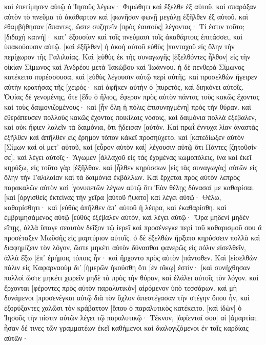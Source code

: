 καὶ ἐπετίμησεν αὐτῷ ὁ Ἰησοῦς λέγων· Φιμώθητι καὶ ἔξελθε ἐξ αὐτοῦ. 
καὶ σπαράξαν αὐτὸν τὸ πνεῦμα τὸ ἀκάθαρτον καὶ [φωνῆσαν φωνῇ μεγάλῃ ἐξῆλθεν ἐξ αὐτοῦ. 
καὶ ἐθαμβήθησαν [ἅπαντες, ὥστε συζητεῖν [πρὸς ἑαυτοὺς] λέγοντας· Τί ἐστιν τοῦτο; [διδαχὴ καινή]· κατ᾽ ἐξουσίαν καὶ τοῖς πνεύμασι τοῖς ἀκαθάρτοις ἐπιτάσσει, καὶ ὑπακούουσιν αὐτῷ. 
[καὶ ἐξῆλθεν] ἡ ἀκοὴ αὐτοῦ εὐθὺς [πανταχοῦ εἰς ὅλην τὴν περίχωρον τῆς Γαλιλαίας. 
Καὶ [εὐθὺς ἐκ τῆς συναγωγῆς [ἐξελθόντες ἦλθον] εἰς τὴν οἰκίαν Σίμωνος καὶ Ἀνδρέου μετὰ Ἰακώβου καὶ Ἰωάννου. 
ἡ δὲ πενθερὰ Σίμωνος κατέκειτο πυρέσσουσα, καὶ [εὐθὺς λέγουσιν αὐτῷ περὶ αὐτῆς. 
καὶ προσελθὼν ἤγειρεν αὐτὴν κρατήσας τῆς [χειρός· καὶ ἀφῆκεν αὐτὴν ὁ [πυρετός, καὶ διηκόνει αὐτοῖς. 
Ὀψίας δὲ γενομένης, ὅτε [ἔδυ ὁ ἥλιος, ἔφερον πρὸς αὐτὸν πάντας τοὺς κακῶς ἔχοντας καὶ τοὺς δαιμονιζομένους· 
καὶ [ἦν ὅλη ἡ πόλις ἐπισυνηγμένη] πρὸς τὴν θύραν. 
καὶ ἐθεράπευσεν πολλοὺς κακῶς ἔχοντας ποικίλαις νόσοις, καὶ δαιμόνια πολλὰ ἐξέβαλεν, καὶ οὐκ ἤφιεν λαλεῖν τὰ δαιμόνια, ὅτι ᾔδεισαν [αὐτόν. 
Καὶ πρωῒ ἔννυχα λίαν ἀναστὰς ἐξῆλθεν καὶ ἀπῆλθεν εἰς ἔρημον τόπον κἀκεῖ προσηύχετο. 
καὶ [κατεδίωξεν αὐτὸν [Σίμων καὶ οἱ μετ᾽ αὐτοῦ, 
καὶ [εὗρον αὐτὸν καὶ] λέγουσιν αὐτῷ ὅτι Πάντες [ζητοῦσίν σε]. 
καὶ λέγει αὐτοῖς· Ἄγωμεν [ἀλλαχοῦ εἰς τὰς ἐχομένας κωμοπόλεις, ἵνα καὶ ἐκεῖ κηρύξω, εἰς τοῦτο γὰρ [ἐξῆλθον. 
καὶ [ἦλθεν κηρύσσων [εἰς τὰς συναγωγὰς] αὐτῶν εἰς ὅλην τὴν Γαλιλαίαν καὶ τὰ δαιμόνια ἐκβάλλων. 
Καὶ ἔρχεται πρὸς αὐτὸν λεπρὸς παρακαλῶν αὐτὸν καὶ [γονυπετῶν λέγων αὐτῷ ὅτι Ἐὰν θέλῃς δύνασαί με καθαρίσαι. 
[καὶ [ὀργισθεὶς ἐκτείνας τὴν χεῖρα [αὐτοῦ ἥψατο] καὶ λέγει αὐτῷ· Θέλω, καθαρίσθητι· 
καὶ [εὐθὺς ἀπῆλθεν ἀπ᾽ αὐτοῦ ἡ λέπρα, καὶ ἐκαθαρίσθη. 
καὶ ἐμβριμησάμενος αὐτῷ [εὐθὺς ἐξέβαλεν αὐτόν, 
καὶ λέγει αὐτῷ· Ὅρα μηδενὶ μηδὲν εἴπῃς, ἀλλὰ ὕπαγε σεαυτὸν δεῖξον τῷ ἱερεῖ καὶ προσένεγκε περὶ τοῦ καθαρισμοῦ σου ἃ προσέταξεν Μωϋσῆς εἰς μαρτύριον αὐτοῖς. 
ὁ δὲ ἐξελθὼν ἤρξατο κηρύσσειν πολλὰ καὶ διαφημίζειν τὸν λόγον, ὥστε μηκέτι αὐτὸν δύνασθαι φανερῶς εἰς πόλιν εἰσελθεῖν, ἀλλὰ ἔξω [ἐπ᾽ ἐρήμοις τόποις ἦν· καὶ ἤρχοντο πρὸς αὐτὸν [πάντοθεν. 
Καὶ [εἰσελθὼν πάλιν εἰς Καφαρναοὺμ δι᾽ [ἡμερῶν ἠκούσθη ὅτι [ἐν οἴκῳ] ἐστίν· 
[καὶ συνήχθησαν πολλοὶ ὥστε μηκέτι χωρεῖν μηδὲ τὰ πρὸς τὴν θύραν, καὶ ἐλάλει αὐτοῖς τὸν λόγον. 
καὶ ἔρχονται [φέροντες πρὸς αὐτὸν παραλυτικὸν] αἰρόμενον ὑπὸ τεσσάρων. 
καὶ μὴ δυνάμενοι [προσενέγκαι αὐτῷ διὰ τὸν ὄχλον ἀπεστέγασαν τὴν στέγην ὅπου ἦν, καὶ ἐξορύξαντες χαλῶσι τὸν κράβαττον [ὅπου ὁ παραλυτικὸς κατέκειτο. 
[καὶ ἰδὼν] ὁ Ἰησοῦς τὴν πίστιν αὐτῶν λέγει τῷ παραλυτικῷ· Τέκνον, [ἀφίενταί σου] αἱ [ἁμαρτίαι. 
ἦσαν δέ τινες τῶν γραμματέων ἐκεῖ καθήμενοι καὶ διαλογιζόμενοι ἐν ταῖς καρδίαις αὐτῶν· 
